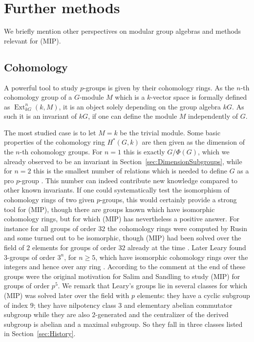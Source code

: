 \documentclass[11pt, a4paper]{amsart}
\theoremstyle{definition}
\begin{document}
\section{Further methods}\label{sec:further}

We briefly mention other perspectives on modular group algebras and methods relevant for (MIP).

\subsection{Cohomology}\label{sec:Cohomology}

A powerful tool to study $p$-groups is given by their cohomology rings. As the $n$-th cohomology group of a $G$-module $M$ which is a $k$-vector space is formally defined as $\operatorname{Ext}^n_{kG}(k, M)$, it is an object solely depending on the group algebra $kG$. As such it is an invariant of $kG$, if one can define the module $M$ independently of $G$.

The most studied case is to let $M = k$ be the trivial module. Some basic properties of the cohomology ring $H^*(G, k)$ are then given as the dimension of the $n$-th cohomology groups. For $n =1$ this is exactly $G/\Phi(G)$, which we already observed to be an invariant in Section~\ref{sec:DimensionSubgroups}, while for $n = 2$ this is the smallest number of relations which is needed to define $G$ as a pro $p$-group \cite[(3.9.5) Corollary]{NeukirchSchmidtWinberg}. This number can indeed contribute new knowledge compared to other known invariants.
If one could systematically test the isomorphism of cohomology rings of two given $p$-groups, this would certainly provide a strong tool for (MIP), though there are groups known which have isomorphic cohomology rings, but for which (MIP) has nevertheless a positive answer. For instance for all groups of order $32$ the cohomology rings were computed by Rusin \cite{Rusin} and some turned out to be isomorphic, though (MIP) had been solved over the field of $2$ elements for groups of order $32$ already at the time \cite{Makasikis}. Later Leary found $3$-groups of order $3^n$, for $n \geq 5$, which have isomorphic cohomology rings over the integers and hence over any ring \cite{Leary3groups}. According to the comment at the end of \cite{SalimSandlingp5} these groups were the original motivation for Salim and Sandling to study (MIP) for groups of order $p^5$. We remark that Leary's groups lie in several classes for which (MIP) was solved later over the field with $p$ elements: they have a cyclic subgroup of index $9$; they have nilpotency class $3$ and elementary abelian commutator subgroup while they are also $2$-generated and the centralizer of the derived subgroup is abelian and a maximal subgroup. So they fall in three classes listed in Section~\ref{sec:History}.
\end{document}
